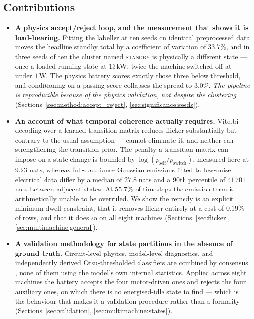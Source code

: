 \subsection*{Contributions}

\begin{itemize}
  \item \textbf{A physics accept/reject loop, and the measurement that
  shows it is load-bearing.} Fitting the labeller at ten seeds on
  identical preprocessed data moves the headline standby total by a
  coefficient of variation of $33.7\%$, and in three seeds of ten the
  cluster named \textsc{standby} is physically a different state
  --- once a loaded running state at $13$\,kW, twice the machine
  switched off at under $1$\,W. The physics battery scores exactly those
  three below threshold, and conditioning on a passing score collapses
  the spread to $3.0\%$. \emph{The pipeline is reproducible because of
  the physics validation, not despite the clustering}
  (Sections~\ref{sec:method:accept_reject},
  \ref{sec:significance:seeds}).

  \item \textbf{An account of what temporal coherence actually
  requires.} Viterbi decoding over a learned transition matrix reduces
  flicker substantially but --- contrary to the usual assumption ---
  cannot eliminate it, and neither can strengthening the transition
  prior. The penalty a transition matrix can impose on a state change is
  bounded by $\log(p_{\text{self}}/p_{\text{switch}})$, measured here at
  $9.23$ nats, whereas full-covariance Gaussian emissions fitted to
  low-noise electrical data differ by a median of $27.8$ nats and a
  $90$th percentile of $41\,701$ nats between adjacent states. At
  $55.7\%$ of timesteps the emission term is arithmetically unable to be
  overruled. We show the remedy is an explicit minimum-dwell constraint,
  that it removes flicker entirely at a cost of $0.19\%$ of rows, and
  that it does so on all eight machines
  (Sections~\ref{sec:flicker}, \ref{sec:multimachine:general}).

  \item \textbf{A validation methodology for state partitions in the
  absence of ground truth.} Circuit-level physics, model-level
  diagnostics, and independently derived Otsu-thresholded classifiers
  \cite{otsu1979threshold} are combined by consensus
  \cite{strehl2002cluster}, none of them using the model's own internal
  statistics. Applied across eight machines the battery accepts the four
  motor-driven ones and rejects the four auxiliary ones, on which there
  is no energised-idle state to find --- which is the behaviour that
  makes it a validation procedure rather than a formality
  (Sections~\ref{sec:validation}, \ref{sec:multimachine:states}).


\end{itemize}
